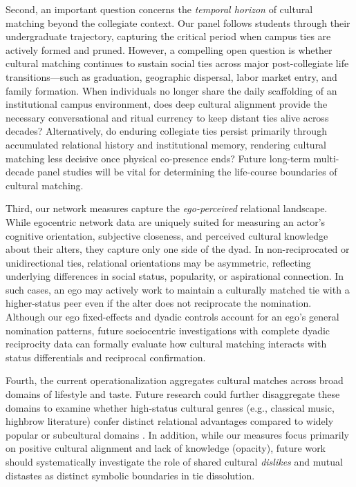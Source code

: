 \documentclass[
  letterpaper,
  DIV=11,
  numbers=noendperiod]{scrartcl}
\begin{document}
Second, an important question concerns the \textit{temporal horizon} of cultural matching beyond the collegiate context. Our panel follows students through their undergraduate trajectory, capturing the critical period when campus ties are actively formed and pruned. However, a compelling open question is whether cultural matching continues to sustain social ties across major post-collegiate life transitions---such as graduation, geographic dispersal, labor market entry, and family formation. When individuals no longer share the daily scaffolding of an institutional campus environment, does deep cultural alignment provide the necessary conversational and ritual currency to keep distant ties alive across decades? Alternatively, do enduring collegiate ties persist primarily through accumulated relational history and institutional memory, rendering cultural matching less decisive once physical co-presence ends? Future long-term multi-decade panel studies will be vital for determining the life-course boundaries of cultural matching.

Third, our network measures capture the \textit{ego-perceived} relational landscape. While egocentric network data are uniquely suited for measuring an actor's cognitive orientation, subjective closeness, and perceived cultural knowledge about their alters, they capture only one side of the dyad. In non-reciprocated or unidirectional ties, relational orientations may be asymmetric, reflecting underlying differences in social status, popularity, or aspirational connection. In such cases, an ego may actively work to maintain a culturally matched tie with a higher-status peer even if the alter does not reciprocate the nomination. Although our ego fixed-effects and dyadic controls account for an ego's general nomination patterns, future sociocentric investigations with complete dyadic reciprocity data can formally evaluate how cultural matching interacts with status differentials and reciprocal confirmation.

Fourth, the current operationalization aggregates cultural matches across broad domains of lifestyle and taste. Future research could further disaggregate these domains to examine whether high-status cultural genres (e.g., classical music, highbrow literature) confer distinct relational advantages compared to widely popular or subcultural domains \citep{dimaggio1987}. In addition, while our measures focus primarily on positive cultural alignment and lack of knowledge (opacity), future work should systematically investigate the role of shared cultural \textit{dislikes} and mutual distastes as distinct symbolic boundaries in tie dissolution.
\end{document}
